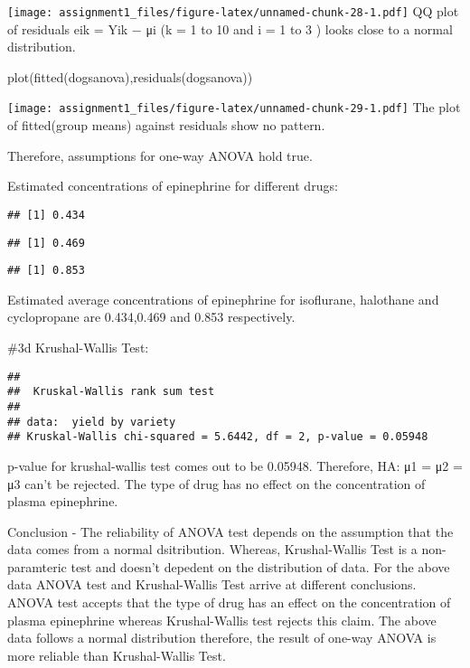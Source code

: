\documentclass[
]{article}
\newenvironment{Shaded}{\begin{snugshade}}{\end{snugshade}}
\newcommand{\FunctionTok}[1]{\textcolor[rgb]{0.00,0.00,0.00}{#1}}
\newcommand{\NormalTok}[1]{#1}
\begin{document}
\texttt{[image: assignment1\_files/figure-latex/unnamed-chunk-28-1.pdf]}
QQ plot of residuals eik = Yik − μi (k = 1 to 10 and i = 1 to 3 ) looks
close to a normal distribution.

\begin{Shaded}
\begin{Highlighting}[]
\FunctionTok{plot}\NormalTok{(}\FunctionTok{fitted}\NormalTok{(dogsanova),}\FunctionTok{residuals}\NormalTok{(dogsanova))}
\end{Highlighting}
\end{Shaded}

\texttt{[image: assignment1\_files/figure-latex/unnamed-chunk-29-1.pdf]}
The plot of fitted(group means) against residuals show no pattern.

Therefore, assumptions for one-way ANOVA hold true.

Estimated concentrations of epinephrine for different drugs:

\begin{verbatim}
## [1] 0.434
\end{verbatim}

\begin{verbatim}
## [1] 0.469
\end{verbatim}

\begin{verbatim}
## [1] 0.853
\end{verbatim}

Estimated average concentrations of epinephrine for isoflurane,
halothane and cyclopropane are 0.434,0.469 and 0.853 respectively.

\#3d Krushal-Wallis Test:

\begin{verbatim}
## 
##  Kruskal-Wallis rank sum test
## 
## data:  yield by variety
## Kruskal-Wallis chi-squared = 5.6442, df = 2, p-value = 0.05948
\end{verbatim}

p-value for krushal-wallis test comes out to be 0.05948. Therefore, HA:
μ1 = μ2 = μ3 can't be rejected. The type of drug has no effect on the
concentration of plasma epinephrine.

Conclusion - The reliability of ANOVA test depends on the assumption
that the data comes from a normal dsitribution. Whereas, Krushal-Wallis
Test is a non-paramteric test and doesn't depedent on the distribution
of data. For the above data ANOVA test and Krushal-Wallis Test arrive at
different conclusions. ANOVA test accepts that the type of drug has an
effect on the concentration of plasma epinephrine whereas Krushal-Wallis
test rejects this claim. The above data follows a normal distribution
therefore, the result of one-way ANOVA is more reliable than
Krushal-Wallis Test.
\end{document}
